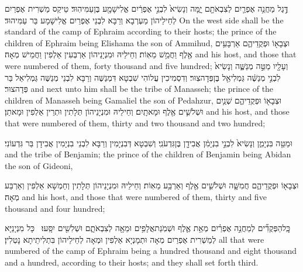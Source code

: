 {דֶּ֣גֶל מַחֲנֵ֥ה אֶפְרַ֛יִם לְצִבְאֹתָ֖ם יָ֑מָּה וְנָשִׂיא֙ לִבְנֵ֣י אֶפְרַ֔יִם אֱלִישָׁמָ֖ע בֶּן\maqqaf עַמִּיהֽוּד׃}
{טֵיקַס מַשְׁרִית אֶפְרַיִם לְחֵילֵיהוֹן מַעְרְבָא וְרַבָּא לִבְנֵי אֶפְרַיִם אֱלִישָׁמָע בַּר עַמִּיהוּד׃}
{On the west side shall be the standard of the camp of Ephraim according to their hosts; the prince of the children of Ephraim being Elishama the son of Ammihud,}{}
{וּצְבָא֖וֹ וּפְקֻדֵיהֶ֑ם אַרְבָּעִ֥ים אֶ֖לֶף וַחֲמֵ֥שׁ מֵאֽוֹת׃}
{וְחֵילֵיהּ וּמִנְיָנֵיהוֹן אַרְבְּעִין אַלְפִין וַחֲמֵישׁ מְאָה׃}
{and his host, and those that were numbered of them, forty thousand and five hundred;}{}
{וְעָלָ֖יו מַטֵּ֣ה מְנַשֶּׁ֑ה וְנָשִׂיא֙ לִבְנֵ֣י מְנַשֶּׁ֔ה גַּמְלִיאֵ֖ל בֶּן\maqqaf פְּדָהצֽוּר׃}
{וְדִסְמִיכִין עֲלוֹהִי שִׁבְטָא דִּמְנַשֶּׁה וְרַבָּא לִבְנֵי מְנַשֶּׁה גַּמְלִיאֵל בַּר פְּדָהצוּר׃}
{and next unto him shall be the tribe of Manasseh; the prince of the children of Manasseh being Gamaliel the son of Pedahzur,}{}
{וּצְבָא֖וֹ וּפְקֻדֵיהֶ֑ם שְׁנַ֧יִם וּשְׁלֹשִׁ֛ים אֶ֖לֶף וּמָאתָֽיִם׃}
{וְחֵילֵיהּ וּמִנְיָנֵיהוֹן תְּלָתִין וּתְרֵין אַלְפִין וּמָאתַן׃}
{and his host, and those that were numbered of them, thirty and two thousand and two hundred;}{}

{וּמַטֵּ֖ה בִּנְיָמִ֑ן וְנָשִׂיא֙ לִבְנֵ֣י בִנְיָמִ֔ן אֲבִידָ֖ן בֶּן\maqqaf גִּדְעֹנִֽי׃}
{וְשִׁבְטָא דְּבִנְיָמִין וְרַבָּא לִבְנֵי בִנְיָמִין אֲבִידָן בַּר גִּדְעוֹנִי׃}
{and the tribe of Benjamin; the prince of the children of Benjamin being Abidan the son of Gideoni,}{}

{וּצְבָא֖וֹ וּפְקֻדֵיהֶ֑ם חֲמִשָּׁ֧ה וּשְׁלֹשִׁ֛ים אֶ֖לֶף וְאַרְבַּ֥ע מֵאֽוֹת׃}
{וְחֵילֵיהּ וּמִנְיָנֵיהוֹן תְּלָתִין וְחַמְשָׁא אַלְפִין וְאַרְבַּע מְאָה׃}
{and his host, and those that were numbered of them, thirty and five thousand and four hundred;}{}

{כׇּֽל\maqqaf הַפְּקֻדִ֞ים לְמַחֲנֵ֣ה אֶפְרַ֗יִם מְאַ֥ת אֶ֛לֶף וּשְׁמֹֽנַת\maqqaf אֲלָפִ֥ים וּמֵאָ֖ה לְצִבְאֹתָ֑ם וּשְׁלִשִׁ֖ים יִסָּֽעוּ׃ \setuma }
{כָּל מִנְיָנַיָּא לְמַשְׁרִית אֶפְרַיִם מְאָה וּתְמָנְיָא אַלְפִין וּמְאָה לְחֵילֵיהוֹן בִּתְלִיתֵיתָא נָטְלִין׃}
{all that were numbered of the camp of Ephraim being a hundred thousand and eight thousand and a hundred, according to their hosts; and they shall set forth third.}{}

